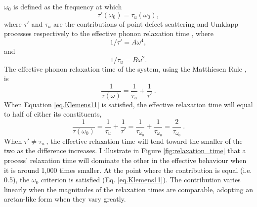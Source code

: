 $\omega_{\mathrm{0}}$ is defined \citep[by][Eq. 11]{Klemens1960} as the frequency at which 
%
\begin{equation}
{\tau}'\left ( \omega_{\mathrm{0}} \right ) = \tau_{u}\left ( \omega_{\mathrm{0}} \right ),
\label{eq.Klemens11}
\end{equation}
%
where ${\tau}'$ and $\tau_{u}$ are the contributions of point defect scattering and Umklapp processes respectively to the effective phonon relaxation time \citep[][Eq.~2~\&~3]{Klemens1960}, where
%
\begin{equation}
1/{\tau}'= A\omega^{4},
\label{eq.Klemens2}
\end{equation}
%
and 
%
\begin{equation}
1/\tau_{u}=B\omega^{2}.
\label{eq.Klemens3}
\end{equation}
%
The effective phonon relaxation time of the system, using the Matthiesen Rule \citep[modified from][Eq. 7]{Klemens1960}, is  
%
\begin{equation}
\frac{1}{\tau \left ( \omega \right )} = \frac{1}{\tau_{u}} + \frac{1}{{\tau}'}\ .
\label{eq.Klemens7}
\end{equation}
%
When Equation \ref{eq.Klemens11} is satisfied, the effective relaxation time will equal to half of either its constituents,
%
\begin{equation}
\frac{1}{\tau \left ( \omega_{0} \right )} = \frac{1}{\tau_{u}} + \frac{1}{{\tau}'} = \frac{1}{\tau_{\omega_{0}}} + \frac{1}{\tau_{\omega_{0}}} = \frac{2}{\tau_{\omega_{0}}}\ .
\label{eq.Klemens7ex}
\end{equation}
%
When ${\tau}' \neq \tau_{u}\ $, the effective relaxation time will tend toward the smaller of the two as the difference increases. I illustrate in Figure \ref{fig:relaxation_time} that a process' relaxation time will dominate the other in the effective behaviour when it is around 1,000 times smaller. At the point where the contribution is equal (i.e. 0.5), the $\omega_{0}$ criterion is satisfied (Eq. \ref{eq.Klemens11}). The contribution varies linearly when the magnitudes of the relaxation times are comparable, adopting an arctan-like form when they vary greatly. 

